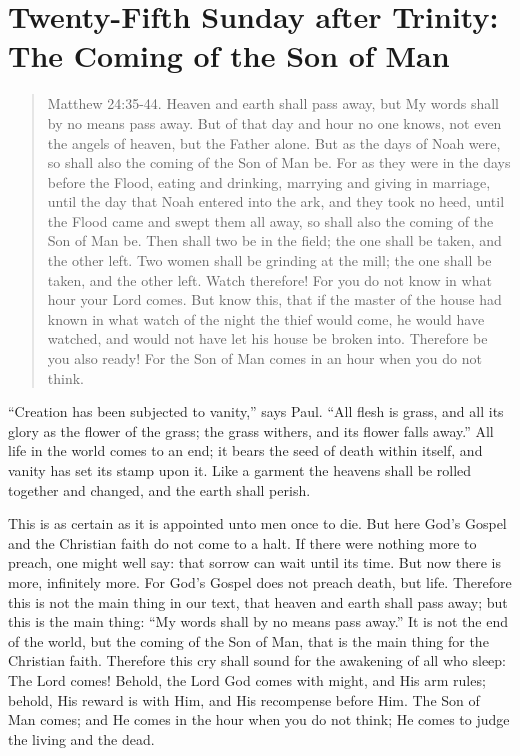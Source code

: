 
\section{Twenty-Fifth Sunday after Trinity: The Coming of the Son of Man}

\begin{quote}

Matthew 24:35-44. Heaven and earth shall pass away, but My words shall by no means pass away. But of that day and hour no one knows, not even the angels of heaven, but the Father alone. But as the days of Noah were, so shall also the coming of the Son of Man be. For as they were in the days before the Flood, eating and drinking, marrying and giving in marriage, until the day that Noah entered into the ark, and they took no heed, until the Flood came and swept them all away, so shall also the coming of the Son of Man be. Then shall two be in the field; the one shall be taken, and the other left. Two women shall be grinding at the mill; the one shall be taken, and the other left. Watch therefore! For you do not know in what hour your Lord comes. But know this, that if the master of the house had known in what watch of the night the thief would come, he would have watched, and would not have let his house be broken into. Therefore be you also ready! For the Son of Man comes in an hour when you do not think.

\end{quote}

\bigskip


“Creation has been subjected to vanity,” says Paul. “All flesh is grass, and all its glory as the flower of the grass; the grass withers, and its flower falls away.” All life in the world comes to an end; it bears the seed of death within itself, and vanity has set its stamp upon it. Like a garment the heavens shall be rolled together and changed, and the earth shall perish.

This is as certain as it is appointed unto men once to die. But here God’s Gospel and the Christian faith do not come to a halt. If there were nothing more to preach, one might well say: that sorrow can wait until its time. But now there is more, infinitely more. For God’s Gospel does not preach death, but life. Therefore this is not the main thing in our text, that heaven and earth shall pass away; but this is the main thing: “My words shall by no means pass away.” It is not the end of the world, but the coming of the Son of Man, that is the main thing for the Christian faith. Therefore this cry shall sound for the awakening of all who sleep: The Lord comes! Behold, the Lord God comes with might, and His arm rules; behold, His reward is with Him, and His recompense before Him. The Son of Man comes; and He comes in the hour when you do not think; He comes to judge the living and the dead.

